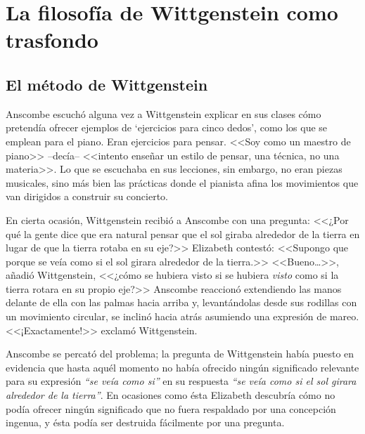 \section{La filosofía de Wittgenstein como trasfondo}

\subsection{El método de Wittgenstein}

Anscombe escuchó alguna vez a Wittgenstein explicar en sus clases cómo pretendía
ofrecer ejemplos de `ejercicios para cinco dedos', como los que se emplean para
el piano. Eran ejercicios para pensar. <<Soy como un maestro de piano>>
--decía-- <<intento enseñar un estilo de pensar, una técnica, no una materia>>.
Lo que se escuchaba en sus lecciones, sin embargo, no eran piezas musicales,
sino más bien las prácticas donde el pianista afina los movimientos que van
dirigidos a construir su
concierto.\autocite[cf.~][p.~357]{KlaggeNordman2003pubnpriv}

En cierta ocasión, Wittgenstein recibió a Anscombe con una pregunta: <<¿Por qué
la gente dice que era natural pensar que el sol giraba alrededor de la tierra en
lugar de que la tierra rotaba en su eje?>> Elizabeth contestó: <<Supongo que
porque se veía como si el sol girara alrededor de la tierra.>> <<Bueno\ldots>>,
añadió Wittgenstein, <<¿cómo se hubiera visto si se hubiera \emph{visto} como si
la tierra rotara en su propio eje?>> Anscombe reaccionó extendiendo las manos
delante de ella con las palmas hacia arriba y, levantándolas desde sus rodillas
con un movimiento circular, se inclinó hacia atrás asumiendo una expresión de
mareo. <<¡Exactamente!>> exclamó
Wittgenstein.\autocite[cf.~][p.~151]{anscombe1959iwt}

Anscombe se percató del problema; la pregunta de Wittgenstein había puesto en
evidencia que hasta aquél momento no había ofrecido ningún significado relevante
para su expresión \emph{``se veía como si''} en su respuesta \emph{``se veía
  como si el sol girara alrededor de la tierra''}. En ocasiones como ésta
Elizabeth descubría cómo no podía ofrecer ningún significado que no fuera
respaldado por una concepción ingenua, y ésta podía ser destruida fácilmente por
una pregunta. 


